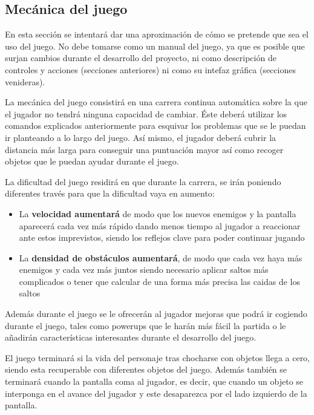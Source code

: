 \documentclass[palatino]{apuntes}
\begin{document}
\subsection{Mecánica del juego}

En esta sección se intentará dar una aproximación de cómo se pretende que sea el uso del juego. No debe tomarse como un manual del juego, ya que es posible que surjan cambios durante el desarrollo del proyecto, ni como descripción de controles y acciones (secciones anteriores) ni como su intefaz gráfica (secciones venideras).

La mecánica del juego consistirá en una carrera continua automática sobre la que el jugador no tendrá ninguna capacidad de cambiar. Éste deberá utilizar los comandos explicados anteriormente para esquivar los problemas que se le puedan ir planteando a lo largo del juego. Así mismo, el jugador deberá cubrir la distancia más larga para conseguir una puntuación mayor así como recoger objetos que le puedan ayudar durante el juego.

La dificultad del juego residirá en que durante la carrera, se irán poniendo diferentes través para que la dificultad vaya en aumento:

\begin{itemize}
    \item La \textbf{velocidad aumentará} de modo que los nuevos enemigos y la pantalla aparecerá cada vez más rápido dando menos tiempo al jugador a reaccionar ante estos imprevistos, siendo los reflejos clave para poder continuar jugando
    \item La \textbf{densidad de obstáculos aumentará}, de modo que cada vez haya más enemigos y cada vez más juntos siendo necesario aplicar saltos más complicados o tener que calcular de una forma más precisa las caidas de los saltos
\end{itemize}

Además durante el juego se le ofrecerán al jugador mejoras que podrá ir cogiendo durante el juego, tales como powerups que le harán más fácil la partida o le añadirán características interesantes durante el desarrollo del juego.

El juego terminará si la vida del personaje tras chocharse con objetos llega a cero, siendo esta recuperable con diferentes objetos del juego. Además también se terminará cuando la pantalla coma al jugador, es decir, que cuando un objeto se interponga en el avance del jugador y este desaparezca por el lado izquierdo de la pantalla.
\end{document}
